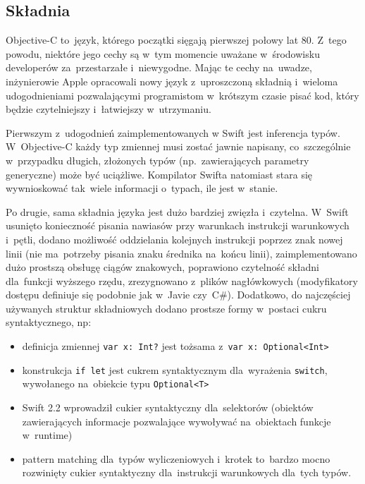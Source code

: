 \documentclass[mgr, shortabstract]{iithesis}
\begin{document}
\subsection{Składnia}

Objective-C to~język, którego początki sięgają pierwszej połowy lat 80. Z~tego powodu, niektóre jego cechy są w~tym momencie uważane w~środowisku developerów za~przestarzałe i~niewygodne. Mając te cechy na~uwadze, inżynierowie Apple opracowali nowy język z~uproszczoną składnią i~wieloma udogodnieniami pozwalającymi programistom w~krótszym czasie pisać kod, który będzie czytelniejszy i~łatwiejszy w~utrzymaniu.

Pierwszym z~udogodnień zaimplementowanych w Swift jest inferencja typów. W~Objective-C każdy typ zmiennej musi zostać jawnie napisany, co~szczególnie w~przypadku długich, złożonych typów (np.~zawierających parametry generyczne) może być uciążliwe. Kompilator Swifta natomiast stara się wywnioskować tak~wiele informacji o~typach, ile jest w~stanie.

Po drugie, sama składnia języka jest dużo bardziej zwięzła i~czytelna. W~Swift usunięto konieczność pisania nawiasów przy warunkach instrukcji warunkowych i~pętli, dodano możliwość oddzielania kolejnych instrukcji poprzez znak nowej linii (nie ma~potrzeby pisania znaku średnika na~końcu linii), zaimplementowano dużo prostszą obsługę ciągów znakowych, poprawiono czytelność składni dla~funkcji wyższego rzędu, zrezygnowano z~plików nagłówkowych (modyfikatory dostępu definiuje się podobnie jak w~Javie czy~C\#). Dodatkowo, do najczęściej używanych struktur składniowych dodano prostsze formy w~postaci cukru syntaktycznego, np:

\begin{itemize}
    \item definicja zmiennej \texttt{var x: Int?} jest tożsama z~\texttt{var x: Optional<Int>}
    \item konstrukcja \texttt{if let} jest cukrem syntaktycznym dla~wyrażenia \texttt{switch}, wywołanego na~obiekcie typu \texttt{Optional<T>}
    \item Swift 2.2 wprowadził cukier syntaktyczny dla~selektorów (obiektów zawierających informacje pozwalające wywoływać na~obiektach funkcje w~runtime)
    \item pattern matching dla~typów wyliczeniowych i~krotek to~bardzo mocno rozwinięty cukier syntaktyczny dla~instrukcji warunkowych dla~tych typów.
\end{itemize}
\end{document}
